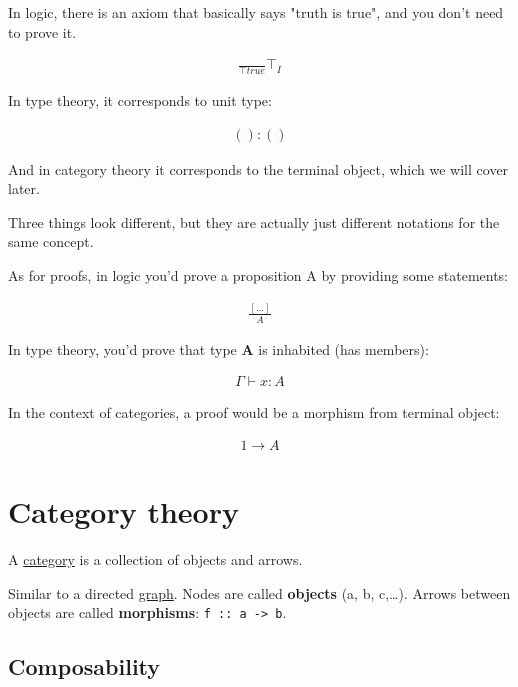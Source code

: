 \documentclass[11pt]{article}
\begin{document}
In logic, there is an axiom that basically says "truth is true", and you don't need to prove it.

\begin{eqnarray}
\frac{}{\top true}\top_I
\end{eqnarray}

In type theory, it corresponds to unit type:

\begin{eqnarray}
():()
\end{eqnarray}

And in category theory it corresponds to the terminal object, which we will cover later.

Three things look different, but they are actually just different notations for the same concept.

As for proofs, in logic you'd prove a proposition A by providing some statements:

\begin{eqnarray}
\frac{[...]}{A}
\end{eqnarray}

In type theory, you'd prove that type \textbf{A} is inhabited (has members):

\begin{eqnarray}
\Gamma\vdash x : A
\end{eqnarray}

In the context of categories, a proof would be a morphism from terminal object:

\begin{eqnarray}
1\rightarrow A
\end{eqnarray}

\section{Category theory}
\label{sec:orga02556f}

A \href{https://en.wikipedia.org/wiki/Category\_theory}{category} is a collection of objects and arrows.

Similar to a directed \href{https://en.wikipedia.org/wiki/Graph\_theory}{graph}. Nodes are called \textbf{objects} (a, b, c,\ldots{}). Arrows between objects are called \textbf{morphisms}: \texttt{f :: a -> b}.

\subsection{Composability}
\label{sec:orgc594467}
\end{document}
